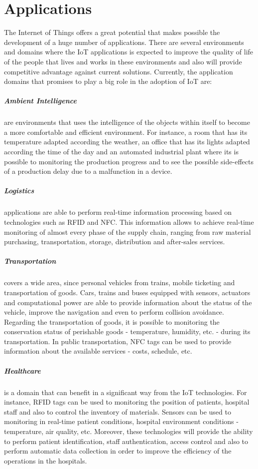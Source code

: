 \section{Applications}
\label{sec:applications}
The Internet of Things offers a great potential that makes possible the development of a huge number
of applications. There are several environments and domains where the \gls{IoT} applications is expected
to improve the quality of life of the people that lives and works in these environments and also
will provide competitive advantage against current solutions. Currently, the application domains that
promises to play a big role in the adoption of \gls{IoT} are:

\subparagraph{Ambient Intelligence} are environments that uses the intelligence of the objects within
itself to become a more comfortable and efficient environment. For instance, a room that has its
temperature adapted according the weather, an office that has its lights adapted according the time
of the day and an automated industrial plant where its is possible to monitoring the production
progress and to see the  possible side-effects of a production delay due to a malfunction in a device.
\subparagraph{Logistics} applications are able to perform real-time information processing based
on technologies such as \gls{RFID} and \gls{NFC}. This information allows to achieve real-time monitoring
of almost every phase of the supply chain, ranging from raw material purchasing, transportation,
storage, distribution and after-sales services.
\subparagraph{Transportation} covers a wide area, since personal vehicles from trains, mobile ticketing
and transportation of goods. Cars, trains and buses equipped with sensors, actuators and computational
power are able to provide information about the status of the vehicle, improve the navigation and even
to perform collision avoidance. Regarding the transportation of goods, it is possible to monitoring
the conservation status of perishable goods - temperature, humidity, etc. -  during its transportation.
In public transportation, NFC tags can be used to provide information about the available services
- costs, schedule, etc.
\subparagraph{Healthcare} is a domain that can benefit in a significant way from the \gls{IoT}
technologies. For instance, \gls{RFID} tags can be used to monitoring the position of patients,
hospital staff and also to control the inventory of materials. Sensors can be used to monitoring
in real-time patient conditions, hospital environment conditions - temperature, air quality, etc.
Moreover, these technologies will provide the ability to perform patient identification, staff authentication,
access control and also to perform automatic data collection in order to improve the efficiency of
the operations in the hospitals.\\

